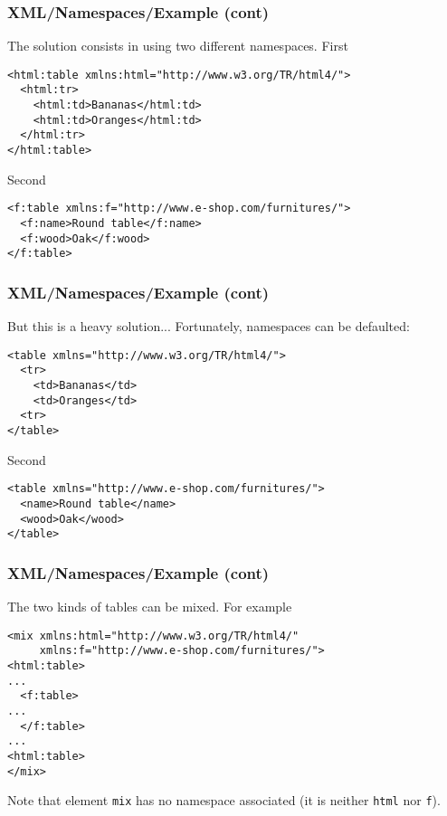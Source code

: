 %
\begin{frame}[containsverbatim]
\frametitle{XML/Namespaces/Example (cont)}

The solution consists in using two different namespaces. First
\begin{verbatim}
<html:table xmlns:html="http://www.w3.org/TR/html4/">
  <html:tr>
    <html:td>Bananas</html:td>
    <html:td>Oranges</html:td>
  </html:tr>
</html:table>
\end{verbatim}
Second
\begin{verbatim}
<f:table xmlns:f="http://www.e-shop.com/furnitures/">
  <f:name>Round table</f:name>
  <f:wood>Oak</f:wood>
</f:table>
\end{verbatim}

\end{frame}

%
\begin{frame}[containsverbatim]
\frametitle{XML/Namespaces/Example (cont)}

But this is a heavy solution... Fortunately, namespaces can be
defaulted:
\begin{verbatim}
<table xmlns="http://www.w3.org/TR/html4/">
  <tr>
    <td>Bananas</td>
    <td>Oranges</td>
  <tr>
</table>
\end{verbatim}
Second
\begin{verbatim}
<table xmlns="http://www.e-shop.com/furnitures/">
  <name>Round table</name>
  <wood>Oak</wood>
</table>
\end{verbatim}

\end{frame}

%
\begin{frame}[containsverbatim]
\frametitle{XML/Namespaces/Example (cont)}

The two kinds of tables can be mixed. For example

\begin{verbatim}
<mix xmlns:html="http://www.w3.org/TR/html4/"
     xmlns:f="http://www.e-shop.com/furnitures/">
<html:table>
...
  <f:table>
...
  </f:table>
...
<html:table>
</mix>
\end{verbatim}
Note that element \texttt{mix} has no namespace associated (it is
neither \texttt{html} nor \texttt{f}).

\end{frame}

